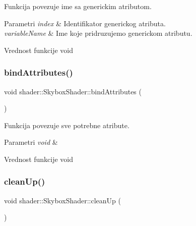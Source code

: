 Funkcija povezuje ime sa generickim atributom. 


\begin{DoxyParams}{Parametri}
{\em index} & Identifikator generickog atributa. \\
\hline
{\em variable\+Name} & Ime koje pridruzujemo generickom atributu. \\
\hline
\end{DoxyParams}
\begin{DoxyReturn}{Vrednost funkcije}
void 
\end{DoxyReturn}
\mbox{\label{classshader_1_1SkyboxShader_a82e42bdf622da1879f391ea65749f1e7}} 
\subsubsection{\texorpdfstring{bind\+Attributes()}{bindAttributes()}}
{\footnotesize\ttfamily void shader\+::\+Skybox\+Shader\+::bind\+Attributes (\begin{DoxyParamCaption}\item[{void}]{ }\end{DoxyParamCaption})}



Funkcija povezuje sve potrebne atribute. 


\begin{DoxyParams}{Parametri}
{\em void} & \\
\hline
\end{DoxyParams}
\begin{DoxyReturn}{Vrednost funkcije}
void 
\end{DoxyReturn}
\mbox{\label{classshader_1_1SkyboxShader_a23be1cc008c7ac985cd34be65c446238}} 
\subsubsection{\texorpdfstring{clean\+Up()}{cleanUp()}}
{\footnotesize\ttfamily void shader\+::\+Skybox\+Shader\+::clean\+Up (\begin{DoxyParamCaption}\item[{void}]{ }\end{DoxyParamCaption})}



